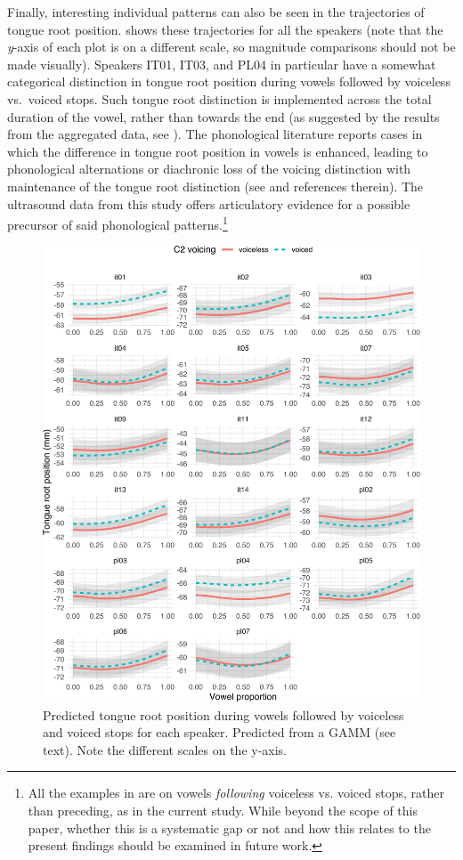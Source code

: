 \documentclass[preprint]{JASAnew}
\begin{document}
Finally, interesting individual patterns can also be seen in the
trajectories of tongue root position.  shows these
trajectories for all the speakers (note that the \emph{y}-axis of each
plot is on a different scale, so magnitude comparisons should not be
made visually). Speakers IT01, IT03, and PL04 in particular have a
somewhat categorical distinction in tongue root position during vowels
followed by voiceless vs.~voiced stops. Such tongue root distinction is
implemented across the total duration of the vowel, rather than towards
the end (as suggested by the results from the aggregated data, see
). The phonological literature reports cases in which the
difference in tongue root position in vowels is enhanced, leading to
phonological alternations or diachronic loss of the voicing distinction
with maintenance of the tongue root distinction (see \citealt{vaux1996}
and references therein). The ultrasound data from this study offers
articulatory evidence for a possible precursor of said phonological
patterns.\footnote{All the examples in \citet{vaux1996} are on vowels \textit{following} voiceless vs. voiced stops, rather than preceding, as in the current study. While beyond the scope of this paper, whether this is a systematic gap or not and how this relates to the present findings should be examined in future work.}

\begin{figure}
\includegraphics[width=\linewidth]{./Figure8-1} \caption{Predicted tongue root position during vowels followed by voiceless and voiced stops for each speaker. Predicted from a GAMM (see text). Note the different scales on the y-axis.}\label{f:Figure8}
\end{figure}
\end{document}
